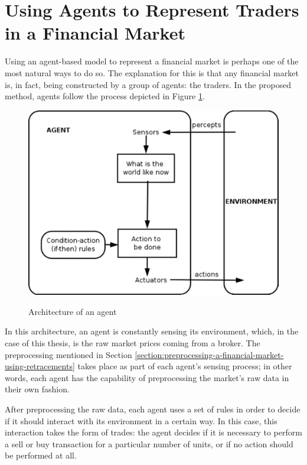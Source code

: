 \section{Using Agents to Represent Traders in a Financial Market}
\label{section:using-agents-to-represent-traders-in-a-financial-market}

Using an agent-based model to represent a financial market is perhaps one of the
most natural ways to do so. The explanation for this is that any financial
market is, in fact, being constructed by a group of agents: the traders. In the
proposed method, agents follow the process depicted in Figure
\ref{figure:agent-architecture}.

\begin{figure}
\caption{Architecture of an agent} \centering
\includegraphics[width=1.0\textwidth]{img/agent-architecture.png}
\label{figure:agent-architecture}
\end{figure}

In this architecture, an agent is constantly sensing its environment, which, in
the case of this thesis, is the raw market prices coming from a broker. The
preprocessing mentioned in Section
\ref{section:preprocessing-a-financial-market-using-retracements} takes place as
part of each agent's sensing process; in other words, each agent has the
capability of preprocessing the market's raw data in their own fashion.

After preprocessing the raw data, each agent uses a set of rules in order to
decide if it should interact with its environment in a certain way. In this
case, this interaction takes the form of trades: the agent decides if it is
necessary to perform a sell or buy transaction for a particular number of units,
or if no action should be performed at all.

